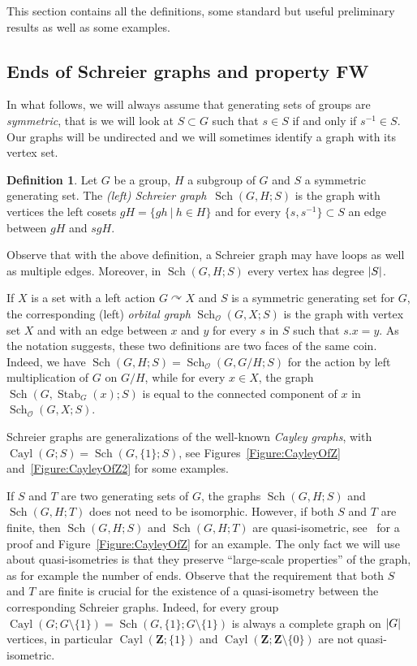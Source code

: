 \documentclass[a4paper]{article}
\theoremstyle{definition}
\newtheorem{defn}[lem]{Definition}
\theoremstyle{remark}
\DeclareMathOperator\Cayley{Cayl}
\DeclareMathOperator\Sch{Sch}
\DeclareMathOperator\stab{Stab}
\DeclarePairedDelimiter\abs{\lvert}{\rvert}
\newcommand*{\field}[1]{\mathbf{#1}}
\newcommand*{\Z}{\field{Z}}
\newcommand{\setst}[2]{\{#1\ |\ #2\}}
\begin{document}
This section contains all the definitions, some standard but useful preliminary results as well as some examples.

\subsection{Ends of Schreier graphs and property FW}
\label{Subsection:FW}
%
%
%
%
%
In what follows, we will always assume that generating sets of groups are \emph{symmetric}, that is we will look at $S\subset G$ such that $s\in S$ if and only if $s^{-1}\in S$.
Our graphs will be undirected and we will sometimes identify a graph with its vertex set.
%
%
\begin{defn}
Let $G$ be a group, $H$ a subgroup of $G$ and $S$ a symmetric generating set. The \emph{(left) Schreier graph} $\Sch(G,H;S)$ is the graph with vertices the left cosets $gH=\setst{gh}{h\in H}$ and for every $\{s,s^{-1}\}\subset S$ an edge between $gH$ and $sgH$.%
\end{defn}
%
%
Observe that with the above definition, a Schreier graph may have loops as well as multiple edges. Moreover, in $\Sch(G,H;S)$ every vertex has degree $\abs S$.

If $X$ is a set with a left action $G\curvearrowright X$ and $S$ is a symmetric generating set for $G$, the corresponding (left) \emph{orbital graph} $\Sch_{\mathcal O}(G,X;S)$ is the graph with vertex set $X$ and with an edge between $x$ and $y$ for every $s$ in $S$ such that $s.x=y$.
As the notation suggests, these two definitions are two faces of the same coin. Indeed, we have $\Sch(G,H;S)=\Sch_{\mathcal O}(G,G/H;S)$ for the  action by left multiplication of $G$ on $G/H$, while   for every $x\in X$, the graph $\Sch(G,\stab_G(x);S)$ is equal to the connected component of $x$ in $\Sch_{\mathcal O}(G,X;S)$.

Schreier graphs are generalizations of the well-known \emph{Cayley graphs}, with $\Cayley(G;S)=\Sch(G,\{1\};S)$, see Figures~\ref{Figure:CayleyOfZ} and~\ref{Figure:CayleyOfZ2} for some examples.

If $S$ and $T$ are two generating sets of $G$, the graphs $\Sch(G,H;S)$ and $\Sch(G,H;T)$ does not need to be isomorphic. However, if both $S$ and $T$ are finite, then $\Sch(G,H;S)$ and $\Sch(G,H;T)$ are quasi-isometric, see~\cite[IV.B.21.iii]{DelaHarpe2000} for a proof and Figure~\ref{Figure:CayleyOfZ} for an example. The only fact we will use about quasi-isometries is that they preserve ``large-scale properties'' of the graph, as for example the number of ends.
Observe that the requirement that both $S$ and $T$ are finite is crucial for the existence of a quasi-isometry between the corresponding Schreier graphs. Indeed, for every group  $\Cayley(G;G\setminus\{1\})=\Sch(G,\{1\};G\setminus\{1\})$ is always a complete graph on $\abs{G}$ vertices, in particular  $\Cayley(\Z;\{1\})$ and $\Cayley(\Z;\Z\setminus\{0\})$ are not quasi-isometric.
\end{document}
